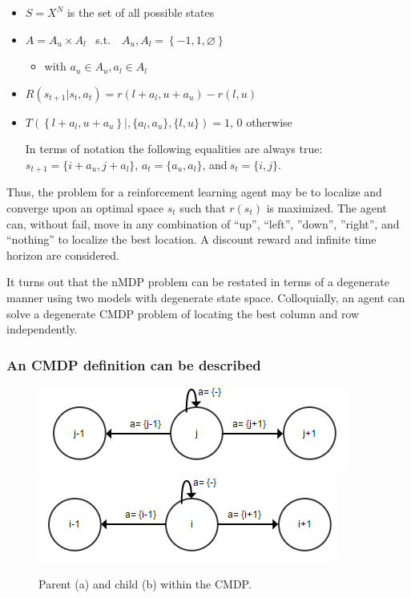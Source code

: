 \documentclass[compsoc,journal,letterpaper,10pt,draftcls,twocolumn]{IEEEtran}
\begin{document}
\begin{itemize}
\item
  \(S = X^{N}\) is the set of all possible states
\item
  \(A = A_{u} \times A_{l} \) \ s.t.\  \ 
  \( A_{u}, A_{l} = \left\{ - 1,1,\varnothing \right\}\)

  \begin{itemize}
  \item
    with \(a_{u} \in A_{u}, a_{l} \in A_{l}\)
  \end{itemize}
\item
  \(R\left( s_{t + 1}|s_{t}, a_{t} \right) = r\left( l + a_{l}, u + a_{u} \right) - r(l,u)\)
\item
  \(T\left( \left\{ l + a_{l},u + a_{u} \right\}|,\{ a_{l},a_{u}\},\{ l,u\} \right) = 1\),
  \(0\) otherwise

  In terms of notation the following equalities are always true:
  \(s_{t + 1} = \{ i + a_{u}, j + a_{l}\}\), \(a_{t} = \{ a_{u},a_{l}\}\), and\(\ s_{t} = \{ i,j\}\).
\end{itemize}

Thus, the problem for a reinforcement learning agent may be to localize
and converge upon an optimal space \(s_{t}\) such that \(r(s_{t})\) is
maximized. The agent can, without fail, move in any combination of
``up'', ``left'', ''down'', ''right'', and ``nothing'' to localize the
best location. A discount reward and infinite time horizon are
considered.

It turns out that the nMDP problem can be restated in terms of a
degenerate manner using two models with degenerate state space.
Colloquially, an agent can solve a degenerate CMDP problem of locating
the best column and row independently.

\subsubsection[An CMDP definition can be
described]{ An CMDP definition can be described}\label{an-cmdp-definition-can-be-described}

\begin{figure}
\includegraphics{media/image3.png}\\
\includegraphics{media/image4.png}\\
\caption{\label{fig:figure2} Parent (a) and child (b) within the CMDP.}
\end{figure}
\end{document}
